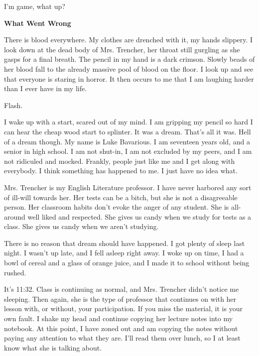  





I'm game, what up?



{\bf What Went Wrong}



There is blood everywhere. My clothes are drenched with it, my
hands slippery. I look down at the dead body of Mrs. Trencher, her
throat still gurgling as she gasps for a final breath. The pencil
in my hand is a dark crimson. Slowly beads of her blood fall to the
already massive pool of blood on the floor. I look up and see that
everyone is staring in horror. It then occurs to me that I am
laughing harder than I ever have in my life.

Flash.

I wake up with a start, scared out of my mind. I am gripping my
pencil so hard I can hear the cheap wood start to splinter. It was
a dream. That's all it was. Hell of a dream though. My name
is Luke Bavarious. I am seventeen years old, and a senior in high
school. I am not shut-in, I am not excluded by my peers, and I am
not ridiculed and mocked. Frankly, people just like me and I get
along with everybody. I think something has happened to me. I just
have no idea what.

Mrs. Trencher is my English Literature professor. I have never
harbored any sort of ill-will towards her. Her tests can be a
bitch, but she is not a disagreeable person. Her classroom habits
don't evoke the anger of any student. She is all-around well
liked and respected. She gives us candy when we study for tests as
a class. She gives us candy when we aren't studying.

There is no reason that dream should have happened. I got plenty of
sleep last night. I wasn't up late, and I fell asleep right
away. I woke up on time, I had a bowl of cereal and a glass of
orange juice, and I made it to school without being rushed.

It's 11:32. Class is continuing as normal, and Mrs. Trencher
didn't notice me sleeping. Then again, she is the type of
professor that continues on with her lesson with, or without, your
participation. If you miss the material, it is your own fault. I
shake my head and continue copying her lecture notes into my
notebook. At this point, I have zoned out and am copying the notes
without paying any attention to what they are. I'll read them
over lunch, so I at least know what she is talking about.

